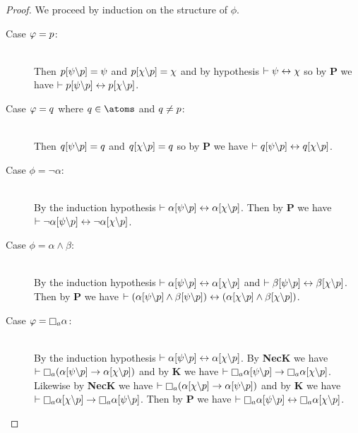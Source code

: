 \begin{proof}
We proceed by induction on the structure of $\phi$.

\begin{description}
    \item[Case $\varphi = p$:]\hfill\\
        Then $p[\psi\backslash p] = \psi$ and $p[\chi\backslash p] = \chi$ and by hypothesis $\vdash \psi \leftrightarrow \chi$ so by {\bf P} we have $\vdash p[\psi\backslash p] \leftrightarrow p[\chi\backslash p]$.

    \item[Case $\varphi = q$ where $\atomQ \in \atoms$ and $q \neq p$:]\hfill\\
        Then $q[\psi\backslash p] = q$ and $q[\chi\backslash p] = q$ so by {\bf P} we have $\vdash q[\psi\backslash p] \leftrightarrow q[\chi\backslash p]$.

    \item[Case $\phi = \lnot \alpha$:]\hfill\\
        By the induction hypothesis $\vdash \alpha[\psi\backslash p] \leftrightarrow \alpha[\chi\backslash p]$.
        Then by {\bf P} we have $\vdash \lnot \alpha[\psi\backslash p] \leftrightarrow \lnot \alpha[\chi\backslash p]$.

    \item[Case $\phi = \alpha \land \beta$:]\hfill\\
        By the induction hypothesis $\vdash \alpha[\psi\backslash p] \leftrightarrow \alpha[\chi\backslash p]$ and $\vdash \beta[\psi\backslash p] \leftrightarrow \beta[\chi\backslash p]$.
        Then by {\bf P} we have $\vdash (\alpha[\psi\backslash p] \land \beta[\psi\backslash p]) \leftrightarrow (\alpha[\chi\backslash p] \land \beta[\chi\backslash p])$.

    \item[Case $\phi = \necessaryA \alpha$:]\hfill\\
        By the induction hypothesis $\vdash \alpha[\psi\backslash p] \leftrightarrow \alpha[\chi\backslash p]$.
        By {\bf NecK} we have $\proves \necessaryA (\alpha[\psi\backslash\atomP] \implies \alpha[\chi\backslash\atomP])$ and by {\bf K} we have $\proves \necessaryA \alpha[\psi\backslash\atomP] \implies \necessaryA \alpha[\chi\backslash\atomP]$.
        Likewise by {\bf NecK} we have $\proves \necessaryA (\alpha[\chi\backslash\atomP] \implies \alpha[\psi\backslash\atomP])$ and by {\bf K} we have $\proves \necessaryA \alpha[\chi\backslash\atomP] \implies \necessaryA \alpha[\psi\backslash\atomP]$.
        Then by {\bf P} we have $\proves \necessaryA \alpha[\psi\backslash\atomP] \iff \necessaryA \alpha[\chi\backslash\atomP]$.


\end{description}
\end{proof}
